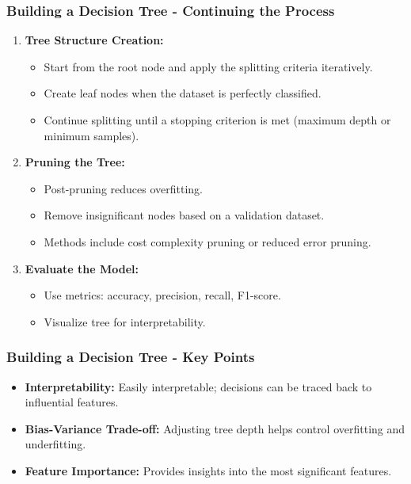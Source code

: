 \documentclass[aspectratio=169]{beamer}
\begin{document}
\begin{frame}[fragile]
    \frametitle{Building a Decision Tree - Continuing the Process}
    \begin{enumerate}[resume]
        \item \textbf{Tree Structure Creation:}
        \begin{itemize}
            \item Start from the root node and apply the splitting criteria iteratively.
            \item Create leaf nodes when the dataset is perfectly classified.
            \item Continue splitting until a stopping criterion is met (maximum depth or minimum samples).
        \end{itemize}

        \item \textbf{Pruning the Tree:}
        \begin{itemize}
            \item Post-pruning reduces overfitting.
            \item Remove insignificant nodes based on a validation dataset.
            \item Methods include cost complexity pruning or reduced error pruning.
        \end{itemize}

        \item \textbf{Evaluate the Model:}
        \begin{itemize}
            \item Use metrics: accuracy, precision, recall, F1-score.
            \item Visualize tree for interpretability.
        \end{itemize}
    \end{enumerate}
\end{frame}

\begin{frame}[fragile]
    \frametitle{Building a Decision Tree - Key Points}
    \begin{itemize}
        \item \textbf{Interpretability:} Easily interpretable; decisions can be traced back to influential features.
        \item \textbf{Bias-Variance Trade-off:} Adjusting tree depth helps control overfitting and underfitting.
        \item \textbf{Feature Importance:} Provides insights into the most significant features.
    \end{itemize}
\end{frame}
\end{document}
